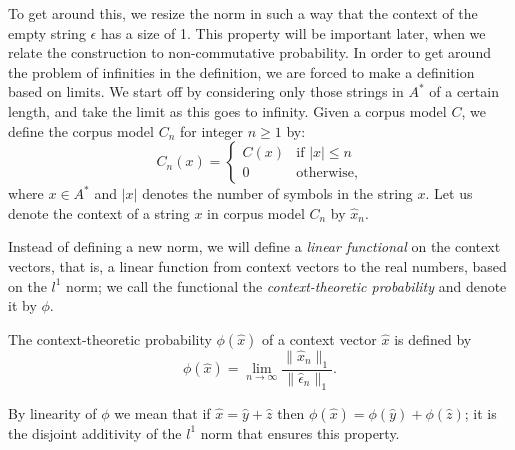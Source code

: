 To get around this, we resize the norm in such a way that the context of the empty string $\epsilon$ has a size of 1. This property will be important later, when we relate the construction to non-commutative probability. In order to get around the problem of infinities in the definition, we are forced to make a definition based on limits. We start off by considering only those strings in $A^*$ of a certain length, and take the limit as this goes to infinity. Given a corpus model $C$, we define the corpus model $C_n$ for integer $n \ge 1$ by:
$$C_n(x) = \begin{cases}
C(x) & \text{if $|x| \le n$}\\
0 & \text{otherwise,}
\end{cases}$$
where $x\in A^*$ and $|x|$ denotes the number of symbols in the string $x$. Let us denote the context of a string $x$ in corpus model $C_n$ by $\hat{x}_n$.

Instead of defining a new norm, we will define a \emph{linear functional} on the context vectors, that is, a linear function from context vectors to the real numbers, based on the $l^1$ norm; we call the functional the \emph{context-theoretic probability} and denote it by $\phi$.

\begin{defn}
The context-theoretic probability $\phi(\hat{x})$ of a context vector $\hat{x}$ is defined by 
$$\phi(\hat{x}) = \lim_{n\rightarrow\infty} \frac{\|\hat{x}_n\|_1}{\|\hat{\epsilon}_n\|_1}.$$ 
\end{defn}

By linearity of $\phi$ we mean that if $\hat{x} = \hat{y} + \hat{z}$ then $\phi(\hat{x}) = \phi(\hat{y}) + \phi(\hat{z})$; it is the disjoint additivity of the $l^1$ norm that ensures this property.


